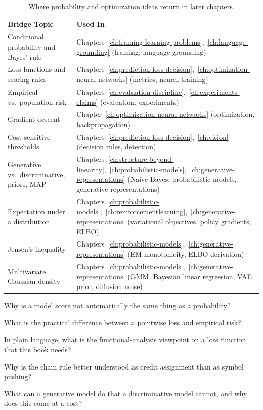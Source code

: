 \begin{table}[h]
\centering
\small
\caption{Where probability and optimization ideas return in later chapters.}
\begin{tabular}{@{}L{3.05cm}L{6.75cm}@{}}
\toprule
\textbf{Bridge Topic} & \textbf{Used In} \\
\midrule
Conditional probability and Bayes' rule & Chapters~\ref{ch:framing-learning-problems},~\ref{ch:language-grounding} (framing, language grounding) \\
Loss functions and scoring rules & Chapters~\ref{ch:prediction-loss-decision},~\ref{ch:optimization-neural-networks} (metrics, neural training) \\
Empirical vs.\ population risk & Chapters~\ref{ch:evaluation-discipline},~\ref{ch:experiments-claims} (evaluation, experiments) \\
Gradient descent & Chapter~\ref{ch:optimization-neural-networks} (optimization, backpropagation) \\
Cost-sensitive thresholds & Chapters~\ref{ch:prediction-loss-decision},~\ref{ch:vision} (decision rules, detection) \\
Generative vs.\ discriminative, priors, MAP & Chapters~\ref{ch:structure-beyond-linearity},~\ref{ch:probabilistic-models},~\ref{ch:generative-representations} (Naive Bayes, probabilistic models, generative representations) \\
Expectation under a distribution & Chapters~\ref{ch:probabilistic-models},~\ref{ch:reinforcementlearning},~\ref{ch:generative-representations} (variational objectives, policy gradients, ELBO) \\
Jensen's inequality & Chapters~\ref{ch:probabilistic-models},~\ref{ch:generative-representations} (EM monotonicity, ELBO derivation) \\
Multivariate Gaussian density & Chapters~\ref{ch:probabilistic-models},~\ref{ch:generative-representations} (GMM, Bayesian linear regression, VAE prior, diffusion noise) \\
\bottomrule
\end{tabular}
\end{table}

\begin{studyquestions}
\item Why is a model score not automatically the same thing as a probability?
\item What is the practical difference between a pointwise loss and empirical risk?
\item In plain language, what is the functional-analysis viewpoint on a loss function that this book needs?
\item Why is the chain rule better understood as credit assignment than as symbol pushing?
\item What can a generative model do that a discriminative model cannot, and why does this come at a cost?
\end{studyquestions}

